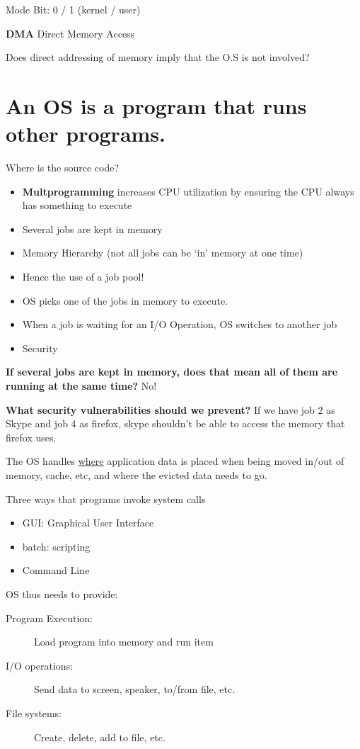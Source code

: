 \documentclass{article}
\begin{document}
Mode Bit: 0 / 1 (kernel / user)

\textbf{DMA} Direct Memory Access

Does direct addressing of memory imply that the O.S is not involved?

\section*{An OS is a program that runs other programs.}
Where is the source code?

\begin{itemize}
    \item \textbf{Multprogramming} increases CPU utilization by ensuring the CPU always has something to execute
    \item Several jobs are kept in memory
    \item Memory Hierarchy (not all jobs can be `in' memory at one time)
    \item Hence the use of a job pool!
    \item OS picks one of the jobs in memory to execute.
    \item When a job is waiting for an I/O Operation, OS switches to another job
    \item Security
\end{itemize}

\textbf{If several jobs are kept in memory, does that mean all of them are running at the same time?}
No!

\textbf{What security vulnerabilities should we prevent?}
If we have job 2 as Skype and job 4 as firefox, skype shouldn't be able to access the memory that firefox uses.

The OS handles \underline{where} application data is placed when being moved
in/out of memory, cache, etc, and where the evicted data needs to go.

Three ways that programs invoke system calls
\begin{itemize}
    \item GUI: Graphical User Interface
    \item batch: scripting
    \item Command Line
\end{itemize}

OS thus needs to provide:
\begin{description}
    \item[Program Execution:] Load program into memory and run item
    \item[I/O operations:] Send data to screen, speaker, to/from file, etc.
    \item[File systems:] Create, delete, add to file, etc.
\end{description}
\end{document}
